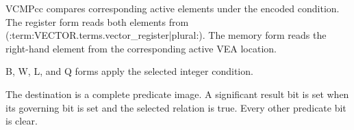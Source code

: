 VCMPcc compares corresponding active elements under the encoded condition.
The register form reads both elements from (:term:VECTOR.terms.vector_register|plural:). The memory form
reads the right-hand element from the corresponding active VEA location.

B, W, L, and Q forms apply the selected integer condition.

The destination is a complete predicate image. A significant result bit is
set when its governing bit is set and the selected relation is true. Every
other predicate bit is clear.
